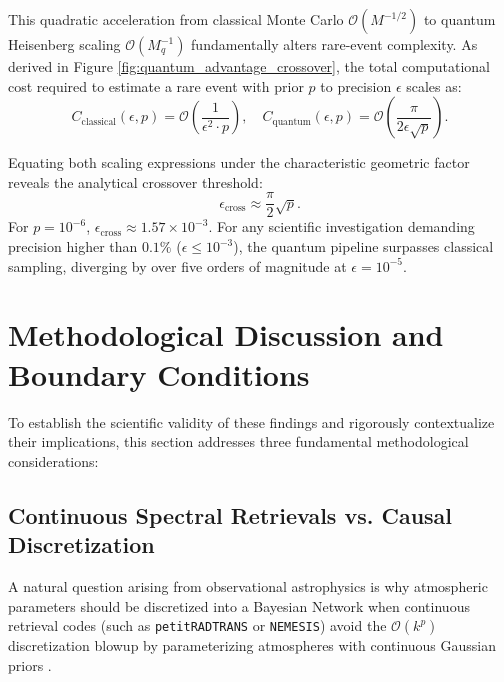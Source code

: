 This quadratic acceleration from classical Monte Carlo $\mathcal{O}(M^{-1/2})$ to quantum Heisenberg scaling $\mathcal{O}(M_q^{-1})$ fundamentally alters rare-event complexity. As derived in Figure \ref{fig:quantum_advantage_crossover}, the total computational cost required to estimate a rare event with prior $p$ to precision $\epsilon$ scales as:
\begin{equation}
C_{\mathrm{classical}}(\epsilon, p) = \mathcal{O}\left(\frac{1}{\epsilon^2 \cdot p}\right), \quad C_{\mathrm{quantum}}(\epsilon, p) = \mathcal{O}\left(\frac{\pi}{2 \epsilon \sqrt{p}}\right).
\label{eq:cost_comparison_ch2}
\end{equation}

Equating both scaling expressions under the characteristic geometric factor reveals the analytical crossover threshold:
\begin{equation}
\epsilon_{\mathrm{cross}} \approx \frac{\pi}{2} \sqrt{p}.
\label{eq:crossover_threshold_derivation}
\end{equation}
For $p = 10^{-6}$, $\epsilon_{\mathrm{cross}} \approx 1.57 \times 10^{-3}$. For any scientific investigation demanding precision higher than $0.1\%$ ($\epsilon \le 10^{-3}$), the quantum pipeline surpasses classical sampling, diverging by over five orders of magnitude at $\epsilon = 10^{-5}$.

\section{Methodological Discussion and Boundary Conditions}\label{sec:methodological_discussion_ch2}

To establish the scientific validity of these findings and rigorously contextualize their implications, this section addresses three fundamental methodological considerations:

\subsection{Continuous Spectral Retrievals vs. Causal Discretization}
A natural question arising from observational astrophysics is why atmospheric parameters should be discretized into a Bayesian Network when continuous retrieval codes (such as \texttt{petitRADTRANS} or \texttt{NEMESIS}) avoid the $\mathcal{O}(k^p)$ discretization blowup by parameterizing atmospheres with continuous Gaussian priors \cite{friedman1996}.

